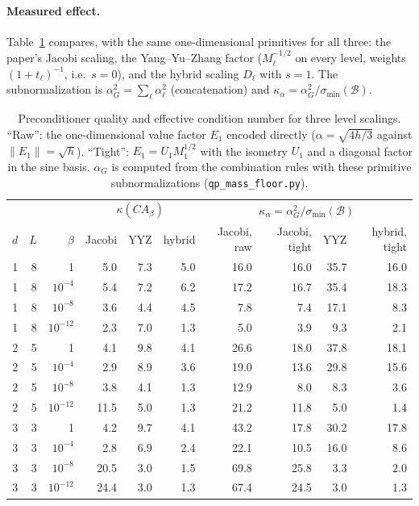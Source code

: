 \documentclass[11pt,a4paper]{article}
\newcommand{\B}{\mathcal{B}}
\begin{document}
\paragraph{Measured effect.} Table~\ref{tab:floor} compares, with the same
one-dimensional primitives for all three: the paper's Jacobi scaling, the
Yang--Yu--Zhang factor ($M_\ell^{-1/2}$ on every level, weights $(1+t_\ell)^{-1}$, i.e.\
$s=0$), and the hybrid scaling $D_\ell$ with $s=1$. The subnormalization is
$\alpha_G^2=\sum_\ell\alpha_\ell^2$ (concatenation) and $\kappa_\alpha=\alpha_G^2/\sigma_{\min}(\B)$.

\begin{table}[ht]
\centering\small
\begin{tabular}{rrr|rrr|rrrr}
\toprule
 & & & \multicolumn{3}{c|}{$\kappa(CA_\beta)$} & \multicolumn{4}{c}{$\kappa_\alpha=\alpha_G^2/\sigma_{\min}(\B)$}\\
$d$ & $L$ & $\beta$ & Jacobi & YYZ & hybrid & Jacobi, raw & Jacobi, tight & YYZ & hybrid, tight\\
\midrule
1 & 8 & 1 & 5.0 & 7.3 & 5.0 & 16.0 & 16.0 & 35.7 & 16.0\\
1 & 8 & $10^{-4}$ & 5.4 & 7.2 & 6.2 & 17.2 & 16.7 & 35.4 & 18.3\\
1 & 8 & $10^{-8}$ & 3.6 & 4.4 & 4.5 & 7.8 & 7.4 & 17.1 & 8.3\\
1 & 8 & $10^{-12}$ & 2.3 & 7.0 & 1.3 & 5.0 & 3.9 & 9.3 & 2.1\\
\midrule
2 & 5 & 1 & 4.1 & 9.8 & 4.1 & 26.6 & 18.0 & 37.8 & 18.1\\
2 & 5 & $10^{-4}$ & 2.9 & 8.9 & 3.6 & 19.0 & 13.6 & 29.8 & 15.6\\
2 & 5 & $10^{-8}$ & 3.8 & 4.1 & 1.3 & 12.9 & 8.0 & 8.3 & 3.6\\
2 & 5 & $10^{-12}$ & 11.5 & 5.0 & 1.3 & 21.2 & 11.8 & 5.0 & 1.4\\
\midrule
3 & 3 & 1 & 4.2 & 9.7 & 4.1 & 43.2 & 17.8 & 30.2 & 17.8\\
3 & 3 & $10^{-4}$ & 2.8 & 6.9 & 2.4 & 22.1 & 10.5 & 16.0 & 8.6\\
3 & 3 & $10^{-8}$ & 20.5 & 3.0 & 1.5 & 69.8 & 25.8 & 3.3 & 2.0\\
3 & 3 & $10^{-12}$ & 24.4 & 3.0 & 1.3 & 67.4 & 24.5 & 3.0 & 1.3\\
\bottomrule
\end{tabular}
\caption{Preconditioner quality and effective condition number for three
level scalings. ``Raw'': the one-dimensional value factor $E_1$ encoded
directly ($\alpha=\sqrt{4h/3}$ against $\|E_1\|=\sqrt h$). ``Tight'': $E_1=U_1M_1^{1/2}$ with the
isometry $U_1$ and a diagonal factor in the sine basis. $\alpha_G$ is computed from
the combination rules with these primitive subnormalizations
(\texttt{qp\_mass\_floor.py}).}
\label{tab:floor}
\end{table}
\end{document}
